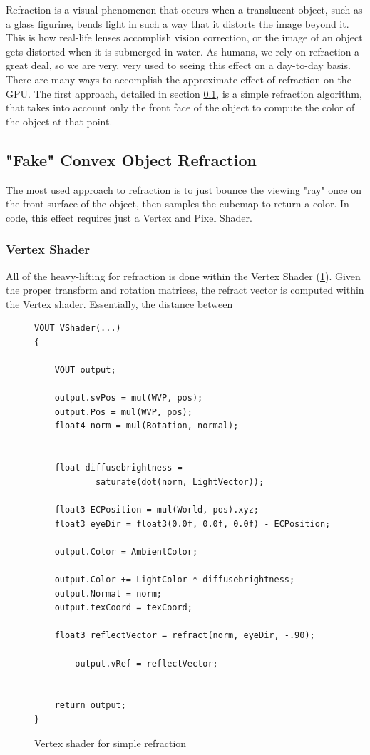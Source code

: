 \documentclass[a4paper, 12pt]{article}
\begin{document}
Refraction is a visual phenomenon that occurs when a translucent object, such
as a glass figurine, bends light in such a way that it distorts the image
beyond it. This is how real-life lenses accomplish vision correction, or the
image of an object gets distorted when it is submerged in water. As humans, we
rely on refraction a great deal, so we are very, very used to seeing this
effect on a day-to-day basis. There are many ways to accomplish the
approximate effect of refraction on the GPU. The first approach, detailed in
section \ref{section:SimpleRefract}, is a simple refraction algorithm, that
takes into account only the front face of the object to compute the color of
the object at that point.

\subsection{"Fake" Convex Object Refraction}
\label{section:SimpleRefract}

The most used approach to refraction is to just bounce the viewing "ray" once
on the front surface of the object, then samples the cubemap to return a
color. In code, this effect requires just a Vertex and Pixel Shader.

\subsubsection{Vertex Shader}

All of the heavy-lifting for refraction is done within the Vertex Shader
(\ref{code:VSSimpleRefract}). Given the proper transform and rotation
matrices, the refract vector is computed within the Vertex shader.
Essentially, the distance between

\begin{figure}[h]
\begin{lstlisting}[breaklines=true,language=HLSL]
VOUT VShader(...)
{

	VOUT output;

	output.svPos = mul(WVP, pos);
	output.Pos = mul(WVP, pos);
	float4 norm = mul(Rotation, normal);


	float diffusebrightness = 
			saturate(dot(norm, LightVector));

	float3 ECPosition = mul(World, pos).xyz;
	float3 eyeDir = float3(0.0f, 0.0f, 0.0f) - ECPosition;
	
	output.Color = AmbientColor;

	output.Color += LightColor * diffusebrightness;
	output.Normal = norm;
	output.texCoord = texCoord;

	float3 reflectVector = refract(norm, eyeDir, -.90);

		output.vRef = reflectVector;


	return output;
}
\end{lstlisting}

\caption{Vertex shader for simple refraction}
\label{code:VSSimpleRefract}
\end{figure}
\end{document}
